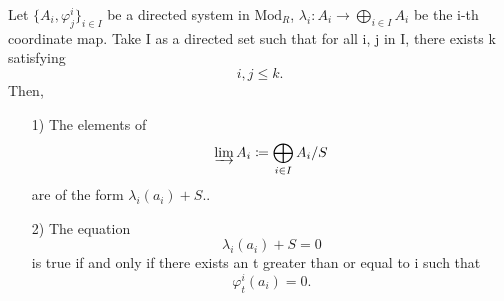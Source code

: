 \documentclass[../category_theory.tex]{subfiles}
\begin{document}
\begin{theorem*}
	Let \(\{A_{i}, \varphi_{j}^{i}\}_{i\in I}\) be a directed system in \(\mathrm{Mod}_{R}\), \(\lambda_{i}:A_{i}\rightarrow \bigoplus_{i\in I}A_{i}\) be the i-th coordinate map. Take I as a directed set such that for all i, j in I, there exists k satisfying
	\[
		i, j\leq k.
	\]
	Then,
	\begin{itemize}
		\item[1)] The elements of
		      \[
			      \varinjlim_{}A_{i}\coloneqq \bigoplus_{i\in I}A_{i}/S
		      \]
		      are of the form \(\lambda_{i}(a_{i})+S.\).
		\item[2)] The equation
		      \[
			      \lambda_{i}(a_{i})+S=0
		      \]
		      is true if and only if there exists an t greater than or equal to i such that
		      \[
			      \varphi_{t}^{i}(a_{i})=0.
		      \]
	\end{itemize}
\end{theorem*}
\end{document}
